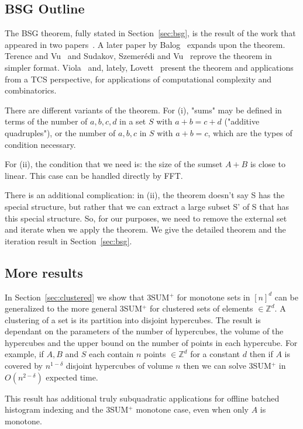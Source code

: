 \documentclass[11pt]{article}
\newcommand{\Z}{\mathbb{Z}}
\begin{document}
{\subsection{BSG Outline}


The BSG theorem, fully stated in Section~\ref{sec:bsg}, is the result of the work that appeared in two papers~\cite{BS94,Gowers01}. A later paper by Balog~\cite{Balog07} expands upon the theorem. Terence and Vu~\cite{TV06} and Sudakov, Szemer\'{e}di and Vu~\cite{SSV94} reprove the theorem in simpler format. Viola~\cite{Viola11} and, lately, Lovett~\cite{Lovett14} present the theorem and applications from a TCS perspective, for applications of computational complexity and combinatorics.


There are different variants of the theorem.
For (i), "sums" may be defined in terms of the number of $a,b,c,d$
in a set $S$ with $a+b=c+d$ ("additive quadruples"), or the number of $a,b,c$
in $S$ with $a+b=c$, which are the types of condition necessary.

For (ii), the
condition that we need is: the size of the sumset $A+B$ is close to linear.
This case can be handled directly by FFT.

There is an additional complication: in (ii), the theorem doesn't
say S has the special structure, but rather that we can extract a large
subset S' of S that has this special structure.  So, for our
purposes, we need to remove the external set and iterate when we apply the theorem. We give the detailed theorem and the iteration result in Section~\ref{sec:bsg}.




\subsection{More results}

In Section~\ref{sec:clustered} we show that 3SUM$^+$ for monotone sets in $[n]^d$ can be generalized to the more general 3SUM$^+$ for clustered sets of elements $\in \Z^d$. A clustering of a set is its partition into disjoint hypercubes. The result is dependant on the parameters of the number of hypercubes, the volume of the hypercubes and the upper bound on the number of points in each hypercube. For example, if $A, B$ and $S$ each contain $n$ points $\in \Z^d$ for a constant $d$ then if $A$ is covered by $n^{1-\delta}$ disjoint hypercubes of volume $n$ then we can solve 3SUM$^+$ in $O(n^{2-\delta})$ expected time.

This result has additional truly subquadratic applications for offline batched histogram indexing and the 3SUM$^+$ monotone case, even when only $A$ is monotone.

}
\end{document}
